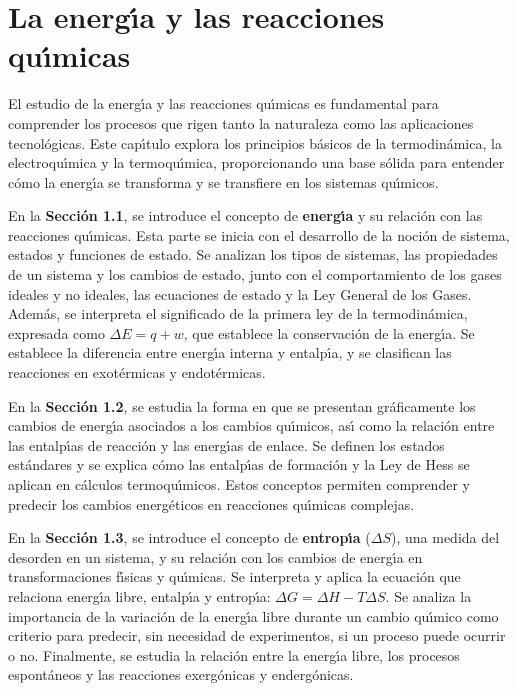 \UseRawInputEncoding
\chapter[Energ\'{\i}a y reacciones]{La energ\'{\i}a y las reacciones qu\'{\i}micas}

El estudio de la energ\'{\i}a y las reacciones qu\'{\i}micas es fundamental para comprender los procesos que rigen tanto la naturaleza como las aplicaciones tecnol\'ogicas. Este cap\'{\i}tulo explora los principios b\'asicos de la termodin\'amica, la electroqu\'{\i}mica y la termoqu\'{\i}mica, proporcionando una base s\'olida para entender c\'omo la energ\'{\i}a se transforma y se transfiere en los sistemas qu\'{\i}micos.

En la \textbf{Secci\'on 1.1}, se introduce el concepto de \textbf{energ\'{\i}a} y su relaci\'on con las reacciones qu\'{\i}micas. Esta parte se inicia con el desarrollo de la noci\'on de sistema, estados y funciones de estado. Se analizan los tipos de sistemas, las propiedades de un sistema y los cambios de estado, junto con el comportamiento de los gases ideales y no ideales, las ecuaciones de estado y la Ley General de los Gases. Adem\'as, se interpreta el significado de la primera ley de la termodin\'amica, expresada como $\Delta E = q + w$, que establece la conservaci\'on de la energ\'{\i}a. Se establece la diferencia entre energ\'{\i}a interna y entalp\'{\i}a, y se clasifican las reacciones en exot\'ermicas y endot\'ermicas.

En la \textbf{Secci\'on 1.2}, se estudia la forma en que se presentan gr\'aficamente los cambios de energ\'{\i}a asociados a los cambios qu\'{\i}micos, as\'{\i} como la relaci\'on entre las entalp\'{\i}as de reacci\'on y las energ\'{\i}as de enlace. Se definen los estados est\'andares y se explica c\'omo las entalp\'{\i}as de formaci\'on y la Ley de Hess se aplican en c\'alculos termoqu\'{\i}micos. Estos conceptos permiten comprender y predecir los cambios energ\'eticos en reacciones qu\'{\i}micas complejas.

En la \textbf{Secci\'on 1.3}, se introduce el concepto de \textbf{entrop\'{\i}a} ($\Delta S$), una medida del desorden en un sistema, y su relaci\'on con los cambios de energ\'{\i}a en transformaciones f\'{\i}sicas y qu\'{\i}micas. Se interpreta y aplica la ecuaci\'on que relaciona energ\'{\i}a libre, entalp\'{\i}a y entrop\'{\i}a: $\Delta G = \Delta H - T \Delta S$. Se analiza la importancia de la variaci\'on de la energ\'{\i}a libre durante un cambio qu\'{\i}mico como criterio para predecir, sin necesidad de experimentos, si un proceso puede ocurrir o no. Finalmente, se estudia la relaci\'on entre la energ\'{\i}a libre, los procesos espont\'aneos y las reacciones exerg\'onicas y enderg\'onicas.

